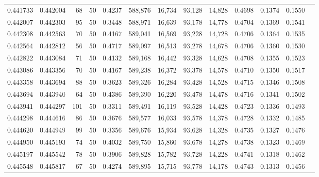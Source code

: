 \begin{tabular}{rrrrrrrrrrrrr}
0.441733 & 0.442004 &    68 &  50 &                                     0.4237 & 588,876 &  16,734 &  93,128 &  14,828 & 0.4698 & 0.1374 & 0.1550 \\
0.442007 & 0.442303 &    95 &  50 &                                     0.3448 & 588,971 &  16,639 &  93,178 &  14,778 & 0.4704 & 0.1369 & 0.1541 \\
0.442308 & 0.442563 &    70 &  50 &                                     0.4167 & 589,041 &  16,569 &  93,228 &  14,728 & 0.4706 & 0.1364 & 0.1535 \\
0.442564 & 0.442812 &    56 &  50 &                                     0.4717 & 589,097 &  16,513 &  93,278 &  14,678 & 0.4706 & 0.1360 & 0.1530 \\
0.442822 & 0.443084 &    71 &  50 &                                     0.4132 & 589,168 &  16,442 &  93,328 &  14,628 & 0.4708 & 0.1355 & 0.1523 \\
0.443086 & 0.443356 &    70 &  50 &                                     0.4167 & 589,238 &  16,372 &  93,378 &  14,578 & 0.4710 & 0.1350 & 0.1517 \\
0.443358 & 0.443694 &    88 &  50 &                                     0.3623 & 589,326 &  16,284 &  93,428 &  14,528 & 0.4715 & 0.1346 & 0.1508 \\
0.443694 & 0.443940 &    64 &  50 &                                     0.4386 & 589,390 &  16,220 &  93,478 &  14,478 & 0.4716 & 0.1341 & 0.1502 \\
0.443941 & 0.444297 &   101 &  50 &                                     0.3311 & 589,491 &  16,119 &  93,528 &  14,428 & 0.4723 & 0.1336 & 0.1493 \\
0.444298 & 0.444616 &    86 &  50 &                                     0.3676 & 589,577 &  16,033 &  93,578 &  14,378 & 0.4728 & 0.1332 & 0.1485 \\
0.444620 & 0.444949 &    99 &  50 &                                     0.3356 & 589,676 &  15,934 &  93,628 &  14,328 & 0.4735 & 0.1327 & 0.1476 \\
0.444950 & 0.445193 &    74 &  50 &                                     0.4032 & 589,750 &  15,860 &  93,678 &  14,278 & 0.4738 & 0.1323 & 0.1469 \\
0.445197 & 0.445542 &    78 &  50 &                                     0.3906 & 589,828 &  15,782 &  93,728 &  14,228 & 0.4741 & 0.1318 & 0.1462 \\
0.445548 & 0.445817 &    67 &  50 &                                     0.4274 & 589,895 &  15,715 &  93,778 &  14,178 & 0.4743 & 0.1313 & 0.1456 \\

\end{tabular}
